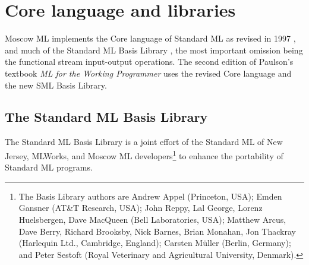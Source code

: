 \documentclass[fleqn]{article}
\begin{document}
%
%
%
%
%
%
%

\newpage

\section{Core language and libraries}

Moscow ML implements the Core language of Standard ML as revised in
1997 \cite{Milner:1997:TheDefinition, Milner:1990:TheDefinition}, and
much of the Standard ML Basis Library \cite{SMLBasis:1996:StandardML},
the most important omission being the functional stream input-output
operations.  The second edition of Paulson's textbook {\em ML for the
  Working Programmer\/} uses the revised Core language and the new SML
Basis Library.


\subsection{The Standard ML Basis Library}

The Standard ML Basis Library is a joint effort of the Standard ML of
New Jersey, MLWorks, and Moscow ML developers\footnote{The Basis
  Library authors are Andrew Appel (Princeton, USA); Emden Gansner
  (AT\&T Research, USA); John Reppy, Lal George, Lorenz Huelsbergen,
  Dave MacQueen (Bell Laboratories, USA); Matthew Arcus, Dave Berry,
  Richard Brooksby, Nick Barnes, Brian Monahan, Jon Thackray
  (Harlequin Ltd., Cambridge, England); Carsten M{\"u}ller (Berlin,
  Germany); and Peter Sestoft (Royal Veterinary and Agricultural
  University, Denmark).} to enhance the portability of Standard ML
programs.
\end{document}
